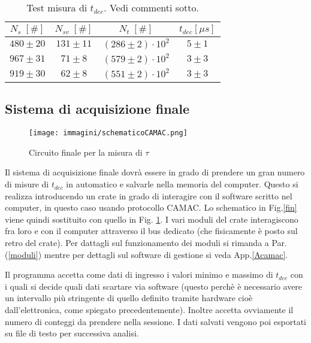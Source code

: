 \documentclass[12pt,a4paper,openright,twoside]{article}
\numberwithin{equation}{section} %
\begin{document}
\begin{table}[]
\centering

\begin{tabular}{|c|c|c|c|}
\hline
$N_s \; [\#]$ & $N_{sv} \; [\#]$ & $N_t \; [\#]$           & $t_{dec} [\mu s ]$ \\ \hline
$480\pm20$   & $131\pm11$      & $(286\pm2) \cdot 10^2$ & $5\pm1$         \\ \hline
$967\pm31$   & $71\pm8$        & $(579\pm2) \cdot 10^2$ & $3\pm3$         \\ \hline
$919\pm30$   & $62\pm8$        & $(551\pm2) \cdot 10^2$ & $3\pm3$         \\ \hline
\end{tabular}
\caption{Test misura di $t_{dec}$. Vedi commenti sotto.}
\label{taumano}
\end{table}

\subsection{Sistema di acquisizione finale}

\begin{figure}[hbtp]
\centering
\texttt{[image: immagini/schematicoCAMAC.png]}
\caption{Circuito finale per la misura di $\tau$}
\label{camac}
\end{figure}

Il sistema di acquisizione finale dovrà essere in grado di prendere un gran numero di misure di $t_{dec}$ in automatico e salvarle nella memoria del computer. Questo si realizza introducendo un crate in grado di interagire con il software scritto nel computer, in questo caso usando protocollo CAMAC. Lo schematico in Fig.\ref{fin} viene quindi sostituito con quello in Fig. \ref{camac}.
I vari moduli del crate interagiscono fra loro e con il computer attraverso il bus dedicato (che fisicamente è posto sul retro del crate).
Per dattagli sul funzionamento dei moduli si rimanda a Par.(\ref{moduli}) mentre per dettagli sul software di gestione si veda App.\ref{Acamac}. 

Il programma accetta come dati di ingresso i valori minimo e massimo di $t_{dec}$ con i quali si decide quali dati scartare via software (questo perchè è necessario avere un intervallo più stringente di quello definito tramite hardware cioè dall'elettronica, come spiegato precedentemente). Inoltre accetta ovviamente il numero di conteggi da prendere nella sessione. I dati salvati vengono poi esportati su file di testo per successiva analisi.
\end{document}
